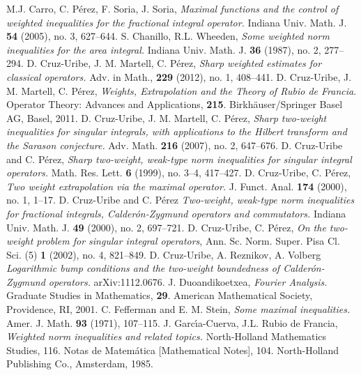 \documentclass[11pt]{amsart}
\theoremstyle{definition}
\begin{document}
\begin{thebibliography}{00}
 M.J. Carro, C. P\'erez, F. Soria, J. Soria, \emph{Maximal functions and the control of weighted inequalities
for the fractional integral operator.}  Indiana Univ. Math. J. \textbf{54} (2005), no. 3, 627--644.
 S. Chanillo, R.L. Wheeden, \emph{Some weighted norm inequalities for the area integral.}  Indiana Univ. Math. J. \textbf{36} (1987), no. 2, 277--294.
 D. Cruz-Uribe, J. M. Martell, C. P\'erez, \emph{Sharp weighted estimates for classical operators.} Adv. in Math., \textbf{229} (2012), no. 1, 408--441.
 D. Cruz-Uribe, J. M. Martell, C. P\'erez, \emph{Weights, Extrapolation and the Theory of Rubio de Francia}. Operator Theory: Advances and Applications, \textbf{215}. Birkh\"auser/Springer Basel AG, Basel, 2011.
 D. Cruz-Uribe, J. M. Martell, C. P\'erez, \emph{Sharp two-weight inequalities for singular integrals, with applications to the Hilbert transform and the Sarason conjecture.} Adv. Math. \textbf{216} (2007), no. 2, 647--676.
 D. Cruz-Uribe and C. P\'erez, \emph{Sharp two-weight, weak-type norm inequalities for singular integral operators.}  Math. Res. Lett. \textbf{6} (1999), no. 3--4, 417--427.
 D. Cruz-Uribe, C. P\'erez, \emph{Two weight extrapolation via the maximal operator.}  J. Funct. Anal. \textbf{174} (2000), no. 1, 1--17.
 D. Cruz-Uribe and C. P\'erez \emph{Two-weight, weak-type norm inequalities for fractional integrals,
Calder\'on-Zygmund operators and commutators.} Indiana Univ. Math. J. \textbf{49} (2000), no. 2, 697--721.
 D. Cruz-Uribe, C. P\'erez, \emph{On the two-weight problem for singular integral operators},  Ann. Sc. Norm. Super. Pisa Cl. Sci. (5) \textbf{1} (2002), no. 4, 821--849.
 D. Cruz-Uribe, A. Reznikov, A. Volberg \emph{Logarithmic bump conditions and the two-weight boundedness of Calder\'on-Zygmund operators.} arXiv:1112.0676.
 J. Duoandikoetxea, \emph{Fourier Analysis.} Graduate Studies in Mathematics, \textbf{29}. American Mathematical Society, Providence, RI, 2001.
 C. Fefferman and E. M. Stein,
\emph{Some maximal inequalities.} Amer. J. Math. \textbf{93} (1971), 107--115.
 J. Garc\'{\i}a-Cuerva, J.L. Rubio de Francia, \emph{Weighted norm inequalities and related topics.} North-Holland Mathematics Studies, 116. Notas de Matem\'atica [Mathematical Notes], 104. North-Holland Publishing Co., Amsterdam, 1985.

\end{thebibliography}
\end{document}
